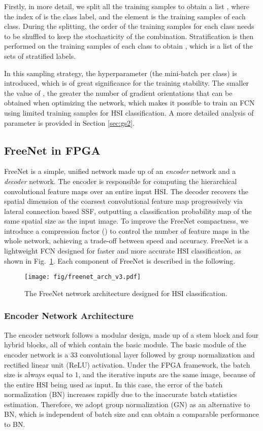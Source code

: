 \documentclass[journal]{IEEEtran}
\begin{document}
Firstly, in more detail, we split all the training samples to obtain a list , where the index of  is the class label, and the element is the training samples of each class.
During the splitting, the order of the training samples for each class needs to be shuffled to keep the stochasticity of the combination.
Stratification is then performed on the training samples of each class to obtain , which is a list of the sets of stratified labels.

In this sampling strategy, the hyperparameter  (the mini-batch per class) is introduced, which is of great significance for the training stability.
The smaller the value of , the greater the number of gradient orientations that can be obtained when optimizing the network, which makes it possible to train an FCN using limited training samples for HSI classification.
A more detailed analysis of parameter  is provided in Section \ref{sec:gs2}.




\subsection{FreeNet in FPGA}
FreeNet is a simple, unified network made up of an \textit{encoder} network and a \textit{decoder} network.
The encoder is responsible for computing the hierarchical convolutional feature maps over an entire input HSI.
The decoder recovers the spatial dimension of the coarsest convolutional feature map progressively via lateral connection based SSF, outputting a classification probability map of the same spatial size as the input image.
To improve the FreeNet compactness, we introduce a compression factor () to control the number of feature maps in the whole network, achieving a trade-off between speed and accuracy.
FreeNet is a lightweight FCN designed for faster and more accurate HSI classification, as shown in Fig.~\ref{fig:freenet}.
Each component of FreeNet is described in the following.
\begin{figure}[hbt]
  \centering
  \texttt{[image: fig/freenet\_arch\_v3.pdf]}
  \caption{The FreeNet network architecture designed for HSI classification.}
  \label{fig:freenet}
\end{figure}
\subsubsection{\textbf{Encoder Network Architecture}}
The encoder network follows a modular design, made up of a stem block and four hybrid blocks, all of which contain the basic module.
The basic module of the encoder network is a 33 convolutional layer followed by group normalization \cite{wu2018group} and rectified linear unit (ReLU) activation.
Under the FPGA framework, the batch size is always equal to 1, and the iterative inputs are the same image, because of the entire HSI being used as input.
In this case, the error of the batch normalization (BN) increases rapidly due to the inaccurate batch statistics estimation.
Therefore, we adopt group normalization (GN) as an alternative to BN, which is independent of batch size and can obtain a comparable performance to BN.
\end{document}
